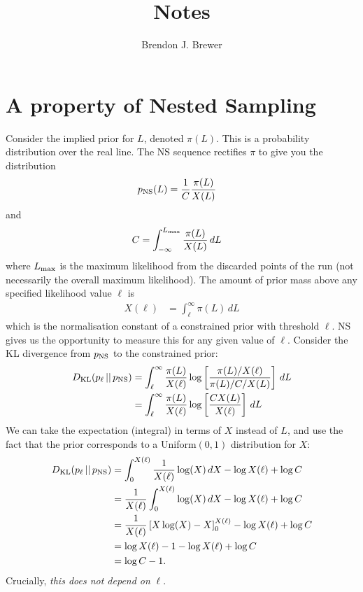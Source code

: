 \documentclass[a4paper, 12pt]{article}
\title{Notes}
\author{Brendon J. Brewer}
\date{}
\begin{document}
\maketitle

\setlength{\parindent}{0pt}
\setlength{\parskip}{8pt}

\section*{A property of Nested Sampling}
Consider the implied prior for $L$, denoted $\pi(L)$. This is
a probability distribution over the real line.
The NS sequence rectifies $\pi$ to give you the distribution
\begin{align}
p_{\rm NS}(L) &= \frac{1}{C} \frac{\pi(L)}{X(L)}
\end{align}
and
\begin{align}
C &= \int_{-\infty}^{L_{\rm max}} \frac{\pi(L)}{X(L)} \, dL
\end{align}
where $L_{\rm max}$ is the maximum likelihood from the
discarded points of the run
(not necessarily the overall maximum likelihood).
The amount of prior mass above any specified likelihood value
$\ell$ is
\begin{align}
X(\ell) &= \int_{\ell}^{\infty} \pi(L) \, dL 
\end{align}
which is the normalisation constant of a constrained prior with
threshold $\ell$.
NS gives us the opportunity to measure this for any given
value of $\ell$. Consider the KL divergence from $p_{\rm NS}$ to
the constrained prior:
\begin{align}
D_{\rm KL}(p_\ell \,||\, p_{\rm NS})
  &= \int_{\ell}^{\infty} \frac{\pi(L)}{X(\ell)}
           \log\left[\frac{\pi(L)/X(\ell)}{\pi(L)/C/X(L)}\right] \, dL \\
  &= \int_{\ell}^{\infty} \frac{\pi(L)}{X(\ell)}
           \log\left[\frac{CX(L)}{X(\ell)}\right] \, dL
\end{align}
We can take the expectation (integral) in terms of $X$ instead of
$L$, and use the fact that the prior corresponds to a
Uniform$(0,1)$ distribution for $X$:
\begin{align}
D_{\rm KL}(p_\ell \,||\, p_{\rm NS})
    &= \int_0^{X(\ell)} \frac{1}{X(\ell)}
           \log(X) \, dX - \log X(\ell) + \log C \\
    &= \frac{1}{X(\ell)} \int_0^{X(\ell)} \log(X) \, dX
           - \log X(\ell) + \log C \\
    &= \frac{1}{X(\ell)}\left[X\log(X) - X\right]_0^{X(\ell)}
           - \log X(\ell) + \log C \\
    &= \log X(\ell) - 1 - \log X(\ell) + \log C \\
    &= \log C - 1.
\end{align}
Crucially, {\em this does not depend on} $\ell$.
\end{document}

